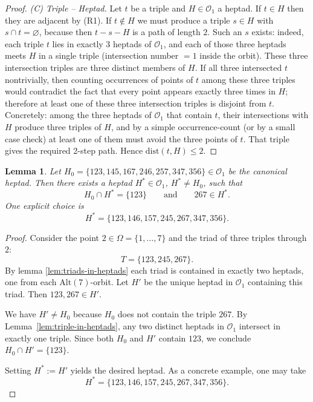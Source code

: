 \documentclass[12pt,a4paper,openany]{book}
\newtheorem{lemma}{Lemma}[section]
\begin{document}
\begin{proof}
\emph{(C) Triple -- Heptad.} Let $t$ be a triple and $H\in\mathcal O_1$ a heptad. If $t\in H$ then they are adjacent by (R1). If $t\notin H$ we must produce a triple $s\in H$ with $s\cap t=\varnothing$, because then $t-s-H$ is a path of length $2$. Such an $s$ exists: indeed, each triple $t$ lies in exactly $3$ heptads of $\mathcal O_1$, and each of those three heptads meets $H$ in a single triple (intersection number \(=1\) inside the orbit). These three intersection triples are three distinct members of $H$. If all three intersected $t$ nontrivially, then counting occurrences of points of $t$ among these three triples would contradict the fact that every point appears exactly three times in $H$; therefore at least one of these three intersection triples is disjoint from $t$. Concretely: among the three heptads of $\mathcal O_1$ that contain $t$, their intersections with $H$ produce three triples of $H$, and by a simple occurrence-count (or by a small case check) at least one of them must avoid the three points of $t$. That triple gives the required 2-step path. Hence $\mathrm{dist}(t,H)\le2$.
\end{proof}

\begin{lemma}\label{h0}
Let $H_0=\{123,145,167,246,257,347,356\}\in\mathcal O_1$ be the canonical heptad.
Then there exists a heptad $H^\ast\in\mathcal O_1$, $H^\ast\neq H_0$, such that
\[
H_0\cap H^\ast=\{123\}\qquad\text{and}\qquad 267\in H^\ast.
\]
One explicit choice is
\[
H^\ast = \{123,146,157,245,267,347,356\}.
\]
\end{lemma}

\begin{proof}
Consider the point $2\in\Omega=\{1,\dots,7\}$ and the triad of three triples through $2$:
\[
T = \{123,245,267\}.
\]
By lemma \ref{lem:triads-in-heptads}  each triad is contained in exactly two heptads, one from each $\mathrm{Alt}(7)$-orbit. Let $H'$ be the unique heptad in $\mathcal O_1$ containing this triad. Then $123,267\in H'$.

We have $H'\neq H_0$ because $H_0$ does not contain the triple $267$. By Lemma~\ref{lem:triple-in-heptads}, any two distinct heptads in $\mathcal O_1$ intersect in exactly one triple. Since both $H_0$ and $H'$ contain $123$, we conclude $H_0 \cap H' = \{123\}$. 

Setting $H^\ast := H'$ yields the desired heptad. As a concrete example, one may take
\[
H^\ast = \{123,146,157,245,267,347,356\}.
\]
\end{proof}
\end{document}
